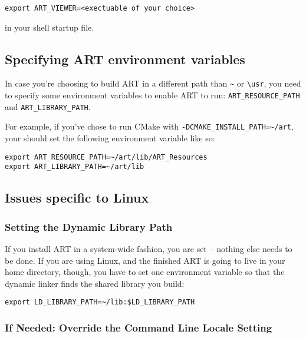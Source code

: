 \begin{verbatim}
export ART_VIEWER=<exectuable of your choice>
\end{verbatim}

in your shell startup file.

\subsection{Specifying ART environment variables}
In case you're choosing to build ART in a different path than \verb?~? or \verb?\usr?, you need to specify some environment variables to enable ART to run: \verb?ART_RESOURCE_PATH? and \verb?ART_LIBRARY_PATH?.

For example, if you've chose to run CMake with \verb?-DCMAKE_INSTALL_PATH=~/art?, your should set the following environment variable like so:

\begin{verbatim}
export ART_RESOURCE_PATH=~/art/lib/ART_Resources                                                                                                                              
export ART_LIBRARY_PATH=~/art/lib
\end{verbatim}

\subsection{Issues specific to Linux}

\subsubsection{Setting the Dynamic Library Path}

If you install ART in a system-wide fashion, you are set -- nothing else needs to be done. If you are using Linux, and the finished ART is going to live in your home directory, though, you have to set one environment variable so that the dynamic linker finds the shared library you build:

\begin{verbatim}
export LD_LIBRARY_PATH=~/lib:$LD_LIBRARY_PATH
\end{verbatim}

\subsubsection{If Needed: Override the Command Line Locale Setting}

